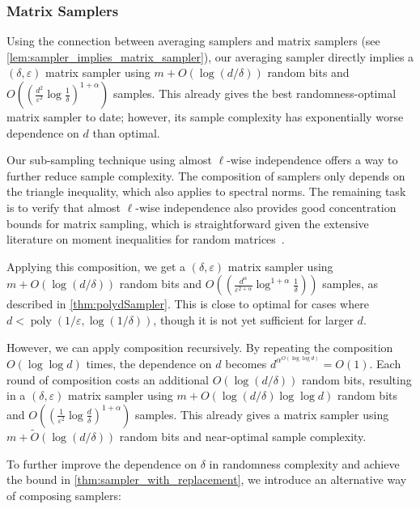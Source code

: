 \documentclass[11pt,letterpaper]{article}
\DeclareMathOperator*{\poly}{poly}
\newcommand{\eps}{\varepsilon}
\newcommand{\1}{\mathbbm{1}}
\newcommand{\wt}{\widetilde}
\begin{document}
\subsubsection{Matrix Samplers}
Using the connection between averaging samplers and matrix samplers (see \cref{lem:sampler_implies_matrix_sampler}), our averaging sampler directly implies a $(\delta, \eps)$ matrix sampler using $m + O(\log(d / \delta))$ random bits and $O((\frac{d^2}{\eps^2} \log \frac{1}{\delta})^{1 + \alpha})$ samples. This already gives the best randomness-optimal matrix sampler to date; however, its sample complexity has exponentially worse dependence on $d$ than optimal. 

Our sub-sampling technique using almost $\ell$-wise independence offers a way to further reduce sample complexity.
The composition of samplers only depends on the triangle inequality, which also applies to spectral norms.
The remaining task is to verify that almost $\ell$-wise independence also provides good concentration bounds for matrix sampling, which is straightforward given the extensive literature on moment inequalities for random matrices~\cite{CGT12, LT13, Tro15}.






Applying this composition, we get a $(\delta, \eps)$ matrix sampler using $m + O(\log(d / \delta))$ random bits and $O((\frac{d^\alpha}{\eps^{2 + \alpha}} \log^{1 + \alpha} \frac{1}{\delta}))$ samples, as described in \cref{thm:polydSampler}. This is close to optimal for cases where $d < \poly(1 / \eps, \log(1 / \delta))$, though it is not yet sufficient for 
larger $d$.

However, we can apply composition recursively. By repeating the composition $O(\log\log d)$ times, the dependence on $d$ becomes $d^{\alpha^{O(\log\log d)}} = O(1)$. Each round of composition costs an additional $O(\log (d / \delta))$ random bits, resulting in a $(\delta, \eps)$ matrix sampler using $m + O(\log(d /\delta) \log \log d)$ random bits and $O((\frac{1}{\eps^2}\log\frac{d}{\delta})^{1 + \alpha})$ samples. This already gives a  matrix sampler using $m + \wt{O}(\log(d / \delta))$ random bits and near-optimal sample complexity.

To further improve the dependence on $\delta$ in randomness complexity and achieve the bound in \cref{thm:sampler_with_replacement}, we introduce an alternative way of composing samplers:
\end{document}
